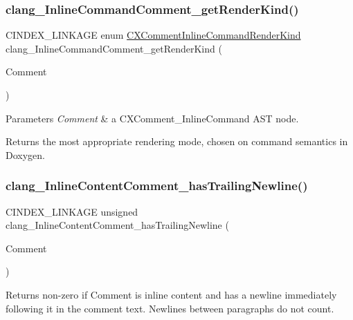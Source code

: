 \subsubsection{\texorpdfstring{clang\+\_\+\+Inline\+Command\+Comment\+\_\+get\+Render\+Kind()}{clang\_InlineCommandComment\_getRenderKind()}}
{\footnotesize\ttfamily C\+I\+N\+D\+E\+X\+\_\+\+L\+I\+N\+K\+A\+GE enum \mbox{\hyperlink{group__CINDEX__COMMENT_ga23efacd9c1e4e286a9f9714e1720fdcf}{C\+X\+Comment\+Inline\+Command\+Render\+Kind}} clang\+\_\+\+Inline\+Command\+Comment\+\_\+get\+Render\+Kind (\begin{DoxyParamCaption}\item[{\mbox{\hyperlink{structCXComment}{C\+X\+Comment}}}]{Comment }\end{DoxyParamCaption})}


\begin{DoxyParams}{Parameters}
{\em Comment} & a {\ttfamily C\+X\+Comment\+\_\+\+Inline\+Command} A\+ST node.\\
\hline
\end{DoxyParams}
\begin{DoxyReturn}{Returns}
the most appropriate rendering mode, chosen on command semantics in Doxygen. 
\end{DoxyReturn}
\mbox{\label{group__CINDEX__COMMENT_gacbc2924271ca86226c024e859e0a75c8}} 
\subsubsection{\texorpdfstring{clang\+\_\+\+Inline\+Content\+Comment\+\_\+has\+Trailing\+Newline()}{clang\_InlineContentComment\_hasTrailingNewline()}}
{\footnotesize\ttfamily C\+I\+N\+D\+E\+X\+\_\+\+L\+I\+N\+K\+A\+GE unsigned clang\+\_\+\+Inline\+Content\+Comment\+\_\+has\+Trailing\+Newline (\begin{DoxyParamCaption}\item[{\mbox{\hyperlink{structCXComment}{C\+X\+Comment}}}]{Comment }\end{DoxyParamCaption})}

\begin{DoxyReturn}{Returns}
non-\/zero if {\ttfamily Comment} is inline content and has a newline immediately following it in the comment text. Newlines between paragraphs do not count. 
\end{DoxyReturn}
\mbox{\label{group__CINDEX__COMMENT_gac78b84734e9e6040a001a0036e6aa15c}} 
